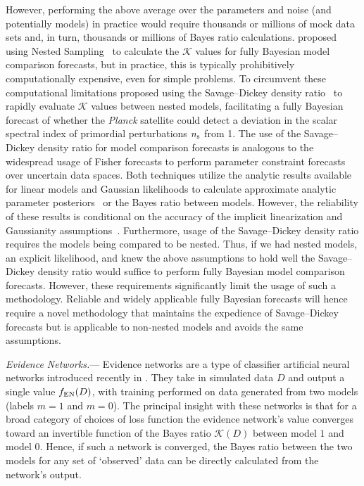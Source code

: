 \documentclass[twocolumn,english,aps,prd,amsmath,amssymb,reprint,floatfix,nofootinbib,showkeys]{revtex4-2}
\newcommand{\br}{\mathcal{K}}
\newcommand{\enf}{f_{\rm EN}(D)}
\newif\ifhighlightchanges
\newcommand{\change}[1]{{\ifhighlightchanges\color{red} #1\else #1\fi}}
\begin{document}
However, performing the above average over the parameters and noise (and potentially models) in practice would require thousands or millions of mock data sets \change{and, in turn, thousands or millions of Bayes ratio calculations.
\citet{Mukherjee_2006} proposed using Nested Sampling~\citep{Skilling_2004, NS_Primer} to calculate the $\br$ values for fully Bayesian model comparison forecasts, but in practice, this is typically}
prohibitively \change{computationally} expensive\change{,} even for simple problems.
\change{To circumvent these computational limitations \citet{Trotta_2007} proposed using the Savage–Dickey density ratio~\citep{Dickey_1971, Verdinelli_1995} to rapidly evaluate $\br$ values between nested models, facilitating a fully Bayesian forecast of whether the \textit{Planck} satellite could detect a deviation in the scalar spectral index of primordial perturbations $n_{\rm s}$ from 1.
The use of the Savage–Dickey density ratio for model comparison forecasts is analogous to the}
widespread usage of Fisher forecasts to perform \change{parameter constraint} forecasts over uncertain data spaces.
\change{Both techniques utilize the analytic results available for linear models and Gaussian likelihoods to calculate approximate analytic parameter posteriors~\citep[e.g.][]{Tegmark_1997} or the Bayes ratio between models.}
However, the reliability of these results is conditional on the accuracy of the implicit linearization and Gaussianity assumptions~\citep[see][]{Perotto_2006, Wolz_2012}.
\change{Furthermore, usage of the Savage–Dickey density ratio requires the models being compared to be nested.
Thus, if we had nested models, an explicit likelihood, and knew the above assumptions to hold well the Savage–Dickey density ratio would suffice to perform fully Bayesian model comparison forecasts.}
However, these requirements significantly limit the \change{usage} of such a methodology. 
Reliable and widely applicable fully Bayesian forecasts will hence require a novel methodology that maintains the expedience of \change{Savage–Dickey} forecasts but is applicable to non-nested models and avoids the same assumptions.





\textit{Evidence Networks.}---
Evidence networks are a type of classifier artificial neural networks introduced recently in \citet{EN}.
They take in simulated data $D$ and output a single value $\enf$, with training performed on data generated from two models (labels $m = 1$ and $m = 0$).
The principal insight with these networks is that for a broad category of choices of loss function the evidence network's value converges toward an invertible function of the Bayes ratio $\br(D)$ between model $1$ and model $0$.
Hence, if such a network is converged, the Bayes ratio between the two models for any set of `observed' data can be directly calculated from the network's output. 
\end{document}
